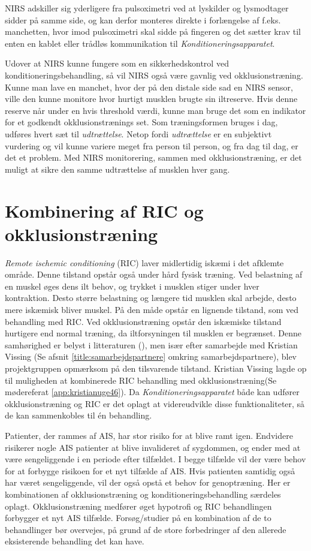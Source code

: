 NIRS adskiller sig yderligere fra pulsoximetri ved at lyskilder og lysmodtager sidder på samme side, og kan derfor monteres direkte i forlængelse af f.eks. manchetten, hvor imod pulsoximetri skal sidde på fingeren og det sætter krav til enten en kablet eller trådløs kommunikation til \textit{Konditioneringsapparatet}. 

Udover at NIRS kunne fungere som en sikkerhedskontrol ved konditioneringsbehandling, så vil NIRS også være gavnlig ved okklusionstræning. Kunne man lave en manchet, hvor der på den distale side sad en NIRS sensor, ville den kunne monitore hvor hurtigt musklen brugte sin iltreserve. Hvis denne reserve når under en hvis threshold værdi, kunne man bruge det som en indikator for et godkendt okklusionstrænings set. Som træningsformen bruges i dag, udføres hvert sæt til \textit{udtrættelse}. Netop fordi \textit{udtrættelse} er en subjektivt vurdering og vil kunne variere meget fra person til person, og fra dag til dag, er det et problem. Med NIRS monitorering, sammen med okklusionstræning, er det muligt at sikre den samme udtrættelse af musklen hver gang. 

\section{Kombinering af RIC og okklusionstræning} \label{title:kombRICogOkkl}
\textit{Remote ischemic conditioning} (RIC) laver midlertidig iskæmi i det afklemte område. Denne tilstand opstår også under hård fysisk træning. Ved belastning af en muskel øges dens ilt behov, og trykket i musklen stiger under hver kontraktion. Desto større belastning og længere tid musklen skal arbejde, desto mere iskæmisk bliver muskel. På den måde opstår en lignende tilstand, som ved behandling med RIC. Ved okklusionstræning opstår den iskæmiske tilstand hurtigere end normal træning, da iltforsyningen til musklen er begrænset. Denne samhørighed er belyst i litteraturen (\cite{RefWorks:3}), men især efter samarbejde med Kristian Vissing (Se afsnit \ref{title:samarbejdspartnere} omkring samarbejdspartnere), blev projektgruppen opmærksom på den tilsvarende tilstand. Kristian Vissing lagde op til muligheden at kombinerede RIC behandling med okklusionstræning(Se mødereferat \ref{app:kristianuge46}). Da \textit{Konditioneringsapparatet} både kan udfører okklusionstræning og RIC er det oplagt at videreudvikle disse funktionaliteter, så de kan sammenkobles til én behandling. 

Patienter, der rammes af AIS, har stor risiko for at blive ramt igen. Endvidere risikerer nogle AIS patienter at blive invalideret af sygdommen, og ender med at være sengeliggende i en periode efter tilfældet. I begge tilfælde vil der være behov for at forbygge risikoen for et nyt tilfælde af AIS. Hvis patienten samtidig også har været sengeliggende, vil der også opstå et behov for genoptræning. Her er kombinationen af okklusionstræning og konditioneringsbehandling særdeles oplagt. Okklusionstræning medfører øget hypotrofi og RIC behandlingen forbygger et nyt AIS tilfælde. Forsøg/studier på en kombination af de to behandlinger bør overvejes, på grund af de store forbedringer af den allerede eksisterende behandling det kan have. 

